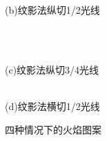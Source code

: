 \documentclass[12pt,a4paper,boxed,titlepage]{caspset}
\begin{document}
\begin{figure}[!htb]
\begin{minipage}[b]{.5\textwidth}
(b)纹影法纵切1/2光线
\end{minipage}
\\
\begin{minipage}[b]{.5\textwidth}
\centering
{}\\
(c)纹影法纵切3/4光线
\end{minipage}%
\begin{minipage}[b]{.5\textwidth}
\centering
{}\\
(d)纹影法横切1/2光线
\end{minipage}
\caption{\label{fire}四种情况下的火焰图案}
\end{figure}
\end{document}
